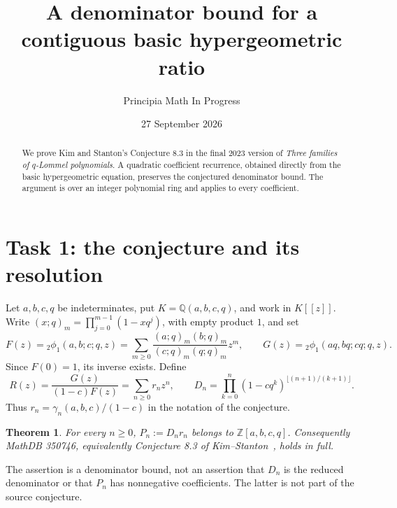 \documentclass[11pt]{article}
\title{A denominator bound for a contiguous basic hypergeometric ratio}
\author{Principia Math In Progress}
\date{27 September 2026}
\newtheorem{theorem}{Theorem}
\newcommand{\Z}{\mathbb Z}
\newcommand{\Q}{\mathbb Q}
\begin{document}
\maketitle
\begin{abstract}
We prove Kim and Stanton's Conjecture 8.3 in the final 2023 version of
\emph{Three families of $q$-Lommel polynomials}. A quadratic coefficient
recurrence, obtained directly from the basic hypergeometric equation,
preserves the conjectured denominator bound. The argument is over an
integer polynomial ring and applies to every coefficient.
\end{abstract}

\section*{Task 1: the conjecture and its resolution}
Let $a,b,c,q$ be indeterminates, put $K=\Q(a,b,c,q)$, and work in $K[[z]]$.
Write $(x;q)_m=\prod_{j=0}^{m-1}(1-xq^j)$, with empty product $1$, and set
\[
 F(z)={}_2\phi_1(a,b;c;q,z)
 =\sum_{m\geq0}\frac{(a;q)_m(b;q)_m}{(c;q)_m(q;q)_m}z^m,
 \qquad G(z)={}_2\phi_1(aq,bq;cq;q,z).
\]
Since $F(0)=1$, its inverse exists. Define
\[
 R(z)=\frac{G(z)}{(1-c)F(z)}=\sum_{n\geq0}r_nz^n,
 \qquad
 D_n=\prod_{k=0}^n(1-cq^k)^{\lfloor(n+1)/(k+1)\rfloor}.
\]
Thus $r_n=\gamma_n(a,b,c)/(1-c)$ in the notation of the conjecture.

\begin{theorem}\label{thm:main}
For every $n\geq0$, $P_n:=D_nr_n$ belongs to $\Z[a,b,c,q]$.
Consequently MathDB 350746, equivalently Conjecture 8.3 of
Kim--Stanton~\cite{KS}, holds in full.
\end{theorem}

The assertion is a denominator bound, not an assertion that $D_n$ is
the reduced denominator or that $P_n$ has nonnegative coefficients.
The latter is not part of the source conjecture.
\end{document}
